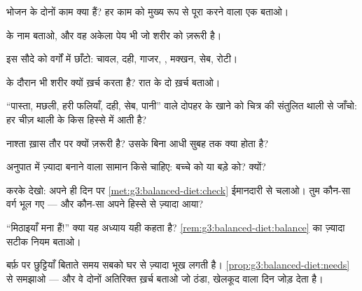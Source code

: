 \begin{exercise}[$\star$]\label{exo:g3:balanced-diet:1}
भोजन के दोनों काम क्या हैं? हर काम को मुख्य रूप से पूरा करने वाला एक
 बताओ।
\end{exercise}

\begin{exercise}[$\star$]\label{exo:g3:balanced-diet:2}
 के नाम बताओ, और वह अकेला पेय भी जो शरीर को ज़रूरी है।
\end{exercise}

\begin{exercise}[$\star$]\label{exo:g3:balanced-diet:3}
इस सौदे को वर्गों में छाँटो: चावल, दही, गाजर, , मक्खन, सेब, रोटी।
\end{exercise}

\begin{exercise}[$\star$]\label{exo:g3:balanced-diet:4}
 के दौरान भी शरीर  क्यों ख़र्च करता है? रात के दो ख़र्च
बताओ।
\end{exercise}

\begin{exercise}[$\star$]\label{exo:g3:balanced-diet:5}
``पास्ता, मछली, हरी फलियाँ, दही, सेब, पानी'' वाले दोपहर के खाने को
चित्र की संतुलित थाली से जाँचो: हर चीज़ थाली के किस हिस्से में आती है?
\end{exercise}

\begin{exercise}[$\star$]\label{exo:g3:balanced-diet:6}
नाश्ता ख़ास तौर पर क्यों ज़रूरी है? उसके बिना आधी सुबह तक क्या होता
है?
\end{exercise}

\begin{exercise}[$\star$]\label{exo:g3:balanced-diet:7}
अनुपात में ज़्यादा बनाने वाला सामान किसे चाहिए: बच्चे को या बड़े को?
क्यों?
\end{exercise}

\begin{exercise}[$\star$]\label{exo:g3:balanced-diet:8}
करके देखो: अपने ही दिन पर \cref{met:g3:balanced-diet:check} ईमानदारी
से चलाओ। तुम कौन-सा वर्ग भूल गए --- और कौन-सा अपने हिस्से से ज़्यादा
आया?
\end{exercise}

\begin{exercise}[$\star\star$]\label{exo:g3:balanced-diet:9}
``मिठाइयाँ मना हैं!'' क्या यह अध्याय यही कहता है?
\cref{rem:g3:balanced-diet:balance} का ज़्यादा सटीक नियम बताओ।
\end{exercise}

\begin{exercise}[$\star\star$]\label{exo:g3:balanced-diet:10}
बर्फ़ पर छुट्टियाँ बिताते समय सबको घर से ज़्यादा भूख लगती है।
\cref{prop:g3:balanced-diet:needs} से समझाओ --- और वे दोनों अतिरिक्त
ख़र्च बताओ जो ठंडा, खेलकूद वाला दिन जोड़ देता है।
\end{exercise}
